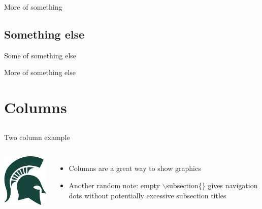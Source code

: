 \documentclass[aspectratio=169]{beamer}
\begin{document}
\begin{frame}
  {More of something}
\end{frame}

\subsection{Something else}

\begin{frame}
  {Some of something else}
\end{frame}

\begin{frame}
  {More of something else}
\end{frame}

\section{Columns}
\subsection{}

\begin{frame}
  {Two column example}
  \begin{columns}
    \includegraphics[width=\textwidth]{Spartan-helmet.jpg}
    \begin{itemize}
      \item Columns are a great way to show graphics
      \item Another random note: empty $\backslash$subsection\{\} gives
        navigation dots without potentially excessive subsection titles
    \end{itemize}
  \end{columns}
\end{frame}
\end{document}
